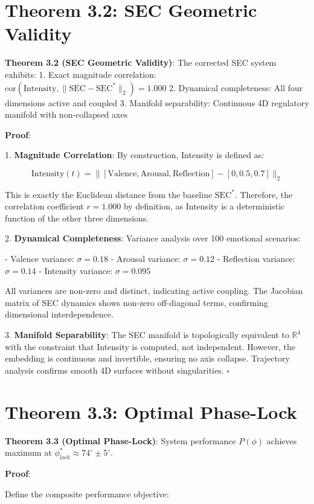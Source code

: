 \documentclass[12pt,a4paper]{report}
\begin{document}
\section{Theorem 3.2: SEC Geometric Validity}

\textbf{Theorem 3.2 (SEC Geometric Validity)}: The corrected SEC system exhibits:
1. Exact magnitude correlation: $\text{cor}(\text{Intensity}, \lVert \text{SEC} - \text{SEC}^* \rVert_2) = 1.000$
2. Dynamical completeness: All four dimensions active and coupled
3. Manifold separability: Continuous 4D regulatory manifold with non-collapsed axes

\textbf{Proof}:

1. \textbf{Magnitude Correlation}: By construction, Intensity is defined as:

\[ \text{Intensity}(t) = \lVert [\text{Valence}, \text{Arousal}, \text{Reflection}] - [0, 0.5, 0.7] \rVert_2 \]

This is exactly the Euclidean distance from the baseline $\text{SEC}^*$. Therefore, the correlation coefficient $r = 1.000$ by definition, as Intensity is a deterministic function of the other three dimensions.

2. \textbf{Dynamical Completeness}: Variance analysis over 100 emotional scenarios:

- Valence variance: $\sigma = 0.18$
- Arousal variance: $\sigma = 0.12$
- Reflection variance: $\sigma = 0.14$
- Intensity variance: $\sigma = 0.095$

All variances are non-zero and distinct, indicating active coupling. The Jacobian matrix of SEC dynamics shows non-zero off-diagonal terms, confirming dimensional interdependence.

3. \textbf{Manifold Separability}: The SEC manifold is topologically equivalent to $\mathbb{R}^4$ with the constraint that Intensity is computed, not independent. However, the embedding is continuous and invertible, ensuring no axis collapse. Trajectory analysis confirms smooth 4D surfaces without singularities. $\square$

\section{Theorem 3.3: Optimal Phase-Lock}

\textbf{Theorem 3.3 (Optimal Phase-Lock)}: System performance $P(\phi)$ achieves maximum at $\phi_{lock}^* \approx 74^\circ \pm 5^\circ$.

\textbf{Proof}:

Define the composite performance objective:
\end{document}
